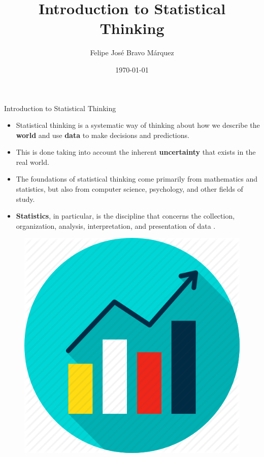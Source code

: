 \documentclass[handout]{beamer}
\title{Introduction to Statistical Thinking}
\author[Felipe Bravo Márquez]{\footnotesize
 \textcolor[rgb]{0.00,0.00,1.00}{Felipe José Bravo Márquez}}
\date{ \today }
\begin{document}
\begin{frame}
\titlepage


\end{frame}




\begin{frame}{Introduction to Statistical Thinking}
\scriptsize{
\begin{itemize}
\item Statistical thinking is a systematic way of thinking about how we describe the \textbf{world} and use \textbf{data} to make decisions and predictions.

\item This is done taking into account the inherent \textbf{uncertainty} that exists in the real world.  \cite{poldrack2019statistical}

 
 \item The foundations of statistical thinking come primarily from mathematics and statistics, but also from computer science, psychology, and other fields of study. \cite{poldrack2019statistical}
 
 \item \textbf{Statistics}, in particular, is the discipline that concerns the collection, organization, analysis, interpretation, and presentation of data \cite{wiki:Statistics}.
 
\end{itemize}

\begin{figure}[h!]
	\centering
	\includegraphics[scale=0.2]{pics/stats.png}
\end{figure}

} 
\end{frame}
\end{document}
